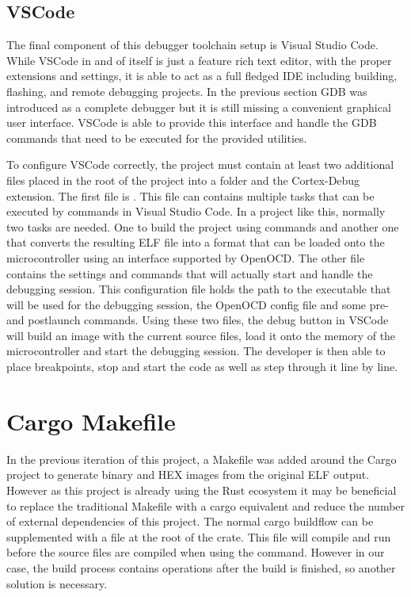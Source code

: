 \subsection{VSCode}

The final component of this debugger toolchain setup is Visual Studio Code. While VSCode in and of itself is just a feature rich text editor, with the proper extensions and settings, it is able to act as a full fledged IDE including building, flashing, and remote debugging projects. In the previous section GDB was introduced as a complete debugger but it is still missing a convenient graphical user interface. VSCode is able to provide this interface and handle the GDB commands that need to be executed for the provided utilities.

To configure VSCode correctly, the project must contain at least two additional files placed in the root of the project into a  folder and the Cortex-Debug extension. \cite{CortexDebug} The first file is . This file can contains multiple tasks that can be executed by commands in Visual Studio Code. In a project like this, normally two tasks are needed. One to build the project using  commands and another one that converts the resulting ELF file into a format that can be loaded onto the microcontroller using an interface supported by OpenOCD. The other file  contains the settings and commands that will actually start and handle the debugging session. This configuration file holds the path to the executable that will be used for the debugging session, the OpenOCD config file and some pre- and postlaunch commands. Using these two files, the debug button in VSCode will build an image with the current source files, load it onto the memory of the microcontroller and start the debugging session. The developer is then able to place breakpoints, stop and start the code as well as step through it line by line.

\section{Cargo Makefile}

In the previous iteration of this project, a Makefile was added around the Cargo project to generate binary and HEX images from the original ELF output. However as this project is already using the Rust ecosystem it may be beneficial to replace the traditional Makefile with a cargo equivalent and reduce the number of external dependencies of this project. The normal cargo buildflow can be supplemented with a  file at the root of the crate. This file will compile and run before the source files are compiled when using the  command. However in our case, the build process contains operations after the build is finished, so another solution is necessary.

